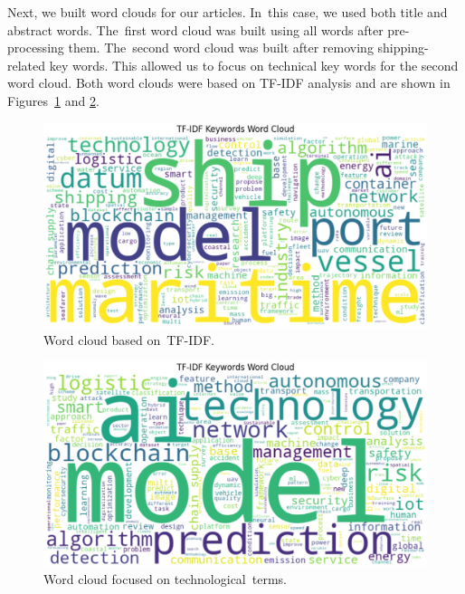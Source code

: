 \documentclass[jmse,review,accept,pdftex,moreauthors]{Definitions/mdpi}
\begin{document}
Next, we built {word clouds} %
for our articles. In~this case, we used both title and abstract words. The~first word cloud was built using all words after pre-processing them. The~second word cloud was built after removing shipping-related key words. This allowed us to focus on technical key words for the second word cloud. Both word clouds were based on TF-IDF analysis and are shown in Figures~\ref{fig:fig11} and \ref{fig:fig12}.



\begin{figure}[H]

	\includegraphics[width=\linewidth]{pics/wordcloud_1.eps}
	\caption{Word cloud based on~TF-IDF.}\label{fig:fig11}
\end{figure}
\unskip



\begin{figure}[H]

	\includegraphics[width=\linewidth]{pics/wordcloud_2.eps}
	\caption{Word cloud focused on technological~terms.}\label{fig:fig12}
\end{figure}
\end{document}
